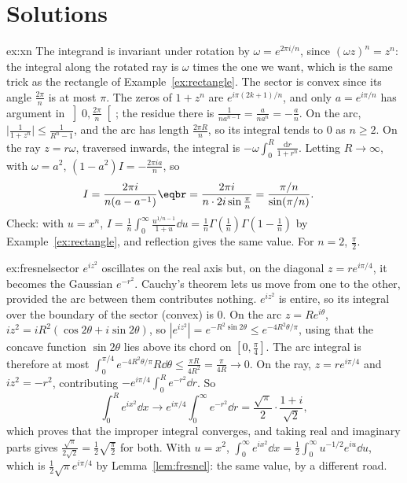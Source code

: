 \section{Solutions}

\begin{solution}{ex:xn}
\idea The integrand is invariant under rotation by $\omega=e^{2\pi i/n}$, since $(\omega z)^n=z^n$: the integral along the rotated ray is $\omega$ times the
one we want, which is the same trick as the rectangle of Example~\ref{ex:rectangle}.
\writeup The sector is convex since its angle $\frac{2\pi}n$ is at most $\pi$. The zeros of $1+z^n$ are $e^{i\pi(2k+1)/n}$, and only $a=e^{i\pi/n}$ has argument in
$\left]0,\frac{2\pi}n\right[$; the residue there is $\frac1{na^{n-1}}=\frac a{na^n}=-\frac an$. On the arc, $\bigl|\frac1{1+z^n}\bigr|\le\frac1{R^n-1}$, and the arc has length $\frac{2\pi R}n$, so its integral
tends to $0$ as $n\ge2$. On the ray $z=r\omega$, traversed inwards, the integral is $-\omega\int_0^R\frac{\mathrm dr}{1+r^n}$. Letting $R\to\infty$, with $\omega=a^2$,
$(1-a^2)I=-\frac{2\pi ia}n$, so
\[
\begin{aligned}I&=\frac{2\pi i}{n(a-a^{-1})}\eqbr=\frac{2\pi i}{n\cdot2i\sin\frac\pi n}=\frac{\pi/n}{\sin(\pi/n)}.\end{aligned}
\]
Check: with $u=x^n$, $I=\frac1n\int_0^\infty\frac{u^{1/n-1}}{1+u}\dd u=\frac1n\Gamma(\frac1n)\Gamma(1-\frac1n)$ by Example~\ref{ex:rectangle}, and reflection gives the same value. For $n=2$, $\frac\pi2$.
\end{solution}

\begin{solution}{ex:fresnelsector}
\idea $e^{iz^2}$ oscillates on the real axis but, on the diagonal $z=re^{i\pi/4}$, it becomes the Gaussian $e^{-r^2}$. Cauchy's theorem lets us move from
one to the other, provided the arc between them contributes nothing.
\writeup $e^{iz^2}$ is entire, so its integral over the boundary of the sector (convex) is $0$. On the arc $z=Re^{i\theta}$, $iz^2=iR^2(\cos2\theta+i\sin2\theta)$, so
$|e^{iz^2}|=e^{-R^2\sin2\theta}\le e^{-4R^2\theta/\pi}$, using that the concave function $\sin2\theta$ lies above its chord on $[0,\frac\pi4]$. The arc integral is therefore at
most $\int_0^{\pi/4}e^{-4R^2\theta/\pi}R\dd\theta\le\frac{\pi R}{4R^2}=\frac\pi{4R}\to0$. On the ray, $z=re^{i\pi/4}$ and $iz^2=-r^2$, contributing $-e^{i\pi/4}\int_0^Re^{-r^2}\dd r$. So
\[
\int_0^Re^{ix^2}\dd x\longrightarrow e^{i\pi/4}\int_0^\infty e^{-r^2}\dd r=\frac{\sqrt\pi}2\cdot\frac{1+i}{\sqrt2},
\]
which proves that the improper integral converges, and taking real and imaginary parts gives $\frac{\sqrt\pi}{2\sqrt2}=\frac12\sqrt{\frac\pi2}$ for both. With $u=x^2$,
$\int_0^\infty e^{ix^2}\dd x=\frac12\int_0^\infty u^{-1/2}e^{iu}\dd u$, which is $\frac12\sqrt\pi e^{i\pi/4}$ by Lemma~\ref{lem:fresnel}: the same value, by a different road.
\end{solution}

